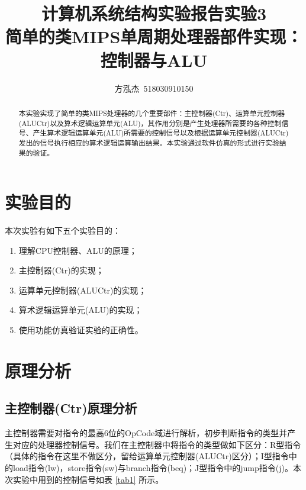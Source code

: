 \documentclass{cumcm}
\title{\textbf{计算机系统结构实验报告\quad 实验3}\\{\Large 简单的类MIPS单周期处理器部件实现：控制器与ALU}}
\author{方泓杰\ 518030910150}
\numberwithin{equation}{section}
\numberwithin{equation}{subsection}
\begin{document}
\maketitle

\begin{abstract}
  本实验实现了简单的类MIPS处理器的几个重要部件：主控制器(Ctr)、运算单元控制器(ALUCtr)以及算术逻辑运算单元(ALU)，其作用分别是产生处理器所需要的各种控制信号、产生算术逻辑运算单元(ALU)所需要的控制信号以及根据运算单元控制器(ALUCtr)发出的信号执行相应的算术逻辑运算输出结果。本实验通过软件仿真的形式进行实验结果的验证。
\end{abstract}

\maketitle \tableofcontents
\newpage

\section{实验目的}\label{section1}
本次实验有如下五个实验目的：
\begin{enumerate}
    \item 理解CPU控制器、ALU的原理；
    \item 主控制器(Ctr)的实现；
    \item 运算单元控制器(ALUCtr)的实现；
    \item 算术逻辑运算单元(ALU)的实现；
    \item 使用功能仿真验证实验的正确性。
\end{enumerate}

\section{原理分析}\label{section2}

\subsection{主控制器(Ctr)原理分析}\label{section2.1}
主控制器需要对指令的最高6位的OpCode域进行解析，初步判断指令的类型并产生对应的处理器控制信号。我们在主控制器中将指令的类型做如下区分：R型指令（具体的指令在这里不做区分，留给运算单元控制器(ALUCtr)区分）；I型指令中的load指令(lw)，store指令(sw)与branch指令(beq)；J型指令中的jump指令(j)。本次实验中用到的控制信号如表 \ref{tab1} 所示。
\end{document}
